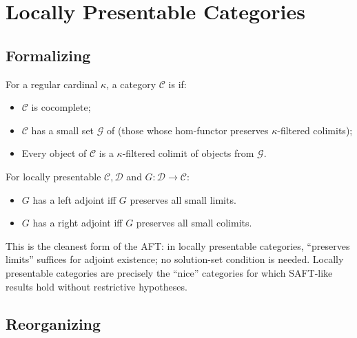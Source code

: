 \section{Locally Presentable Categories}
\label{sec:locally-presentable}

\subsection{Formalizing}

\begin{definition}
\label{def:locally-presentable}
For a regular cardinal $\kappa$, a category $\mathcal{C}$ is
 if:
\begin{itemize}
  \item $\mathcal{C}$ is cocomplete;
  \item $\mathcal{C}$ has a small set $\mathcal{G}$ of  (those whose hom-functor preserves $\kappa$-filtered colimits);
  \item Every object of $\mathcal{C}$ is a $\kappa$-filtered colimit of
        objects from $\mathcal{G}$.
\end{itemize}
\end{definition}

\begin{theorem}
\label{thm:lp-aft}
For locally presentable $\mathcal{C}, \mathcal{D}$ and $G : \mathcal{D} \to
\mathcal{C}$:
\begin{itemize}
  \item $G$ has a left adjoint iff $G$ preserves all small limits.
  \item $G$ has a right adjoint iff $G$ preserves all small colimits.
\end{itemize}
\end{theorem}

\begin{remark}
This is the cleanest form of the AFT: in locally presentable categories,
``preserves limits'' suffices for adjoint existence; no solution-set
condition is needed. Locally presentable categories are precisely the
``nice'' categories for which SAFT-like results hold without restrictive
hypotheses.
\end{remark}

\subsection{Reorganizing}

